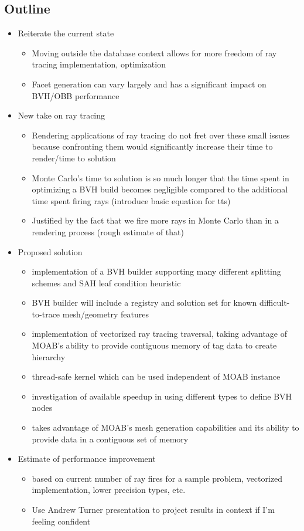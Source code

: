 \documentclass[12pt, a4paper]{article}
\begin{document}
\subsection{Outline}

\begin{itemize}
\item Reiterate the current state
  \begin{itemize}
  \item Moving outside the database context allows for more freedom of ray tracing implementation, optimization
  \item Facet generation can vary largely and has a significant impact on BVH/OBB performance
  \end{itemize}
\item New take on ray tracing
  \begin{itemize}
  \item Rendering applications of ray tracing do not fret over these small issues because confronting them would significantly increase their time to render/time to solution
  \item Monte Carlo's time to solution is so much longer that the time spent in optimizing a BVH build becomes negligible compared to the additional time spent firing rays (introduce basic equation for tts)
  \item Justified by the fact that we fire more rays in Monte Carlo than in a rendering process (rough estimate of that)
  \end{itemize}
\item Proposed solution
  \begin{itemize}
  \item implementation of a BVH builder supporting many different splitting schemes and SAH leaf condition heuristic
  \item BVH builder will include a registry and solution set for known difficult-to-trace mesh/geometry features
  \item implementation of vectorized ray tracing traversal, taking advantage of MOAB's ability to provide contiguous memory of tag data to create hierarchy
  \item thread-safe kernel which can be used independent of MOAB instance
  \item investigation of available speedup in using different types to define BVH nodes
  \item takes advantage of MOAB's mesh generation capabilities and its ability to provide data in a contiguous set of memory
  \end{itemize}
\item Estimate of performance improvement
  \begin{itemize}
  \item based on current number of ray fires for a sample problem, vectorized implementation, lower precision types, etc.
  \item Use Andrew Turner presentation to project results in context if I'm feeling confident
  \end{itemize}
\end{itemize}
\end{document}
